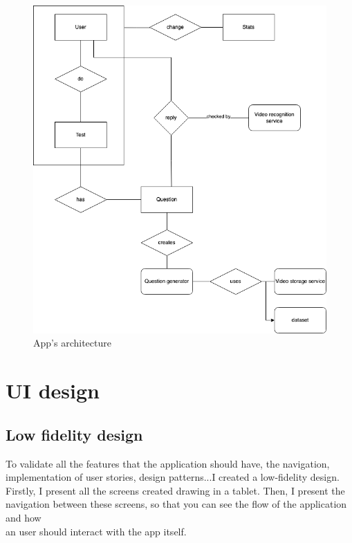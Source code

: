 \begin{figure}[H]
    \centering
        \includegraphics[width=\textwidth]{assets/diagrams/conceptual.png}
    \caption{App's architecture}
    \label{fig:design_conceptual}
\end{figure}

\section{UI design}
\subsection{Low fidelity design}
To validate all the features that the application should have, the navigation, implementation of user stories, design patterns...I created a low-fidelity design. \\

Firstly, I present all the screens created drawing in a tablet. Then, I present the navigation between these screens, so that you can see the flow of the application and how \\
an user should interact with the app itself. \\

